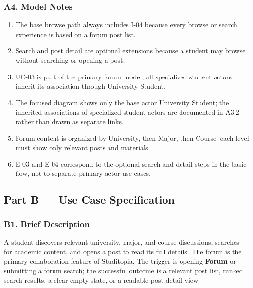 \documentclass[12pt]{article}
\begin{document}
\hypertarget{sec:a4-model-notes}{}
\subsubsection*{A4. Model Notes}
\par\medskip

\begin{enumerate}
\item The base browse path always includes I-04 because every browse or search experience is based on a forum post list.
\item Search and post detail are optional extensions because a student may browse without searching or opening a post.
\item UC-03 is part of the primary forum model; all specialized student actors inherit its association through University Student.
\item The focused diagram shows only the base actor University Student; the inherited associations of specialized student actors are documented in A3.2 rather than drawn as separate links.
\item Forum content is organized by University, then Major, then Course; each level must show only relevant posts and materials.
\item E-03 and E-04 correspond to the optional search and detail steps in the basic flow, not to separate primary-actor use cases.
\end{enumerate}
\par\medskip

\hypertarget{sec:part-b-use-case-specification}{}
\subsection*{Part B --- Use Case Specification}
\par\medskip

\hypertarget{sec:b1-brief-description}{}
\subsubsection*{B1. Brief Description}
\par\medskip

A student discovers relevant university, major, and course discussions, searches for academic content, and opens a post to read its full details. The forum is the primary collaboration feature of Studitopia. The trigger is opening \textbf{Forum} or submitting a forum search; the successful outcome is a relevant post list, ranked search results, a clear empty state, or a readable post detail view.
\par\medskip
\end{document}
